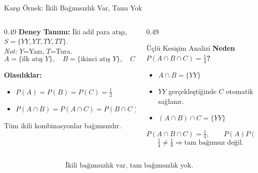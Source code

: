 \documentclass[light]{lutbeamer}
\begin{document}
\begin{frame}[fragile]{Karşı Örnek: İkili Bağımsızlık Var, Tamı Yok}
    \footnotesize
    \begin{columns}[T,onlytextwidth]
        \begin{column}{0.49\textwidth}
            \textbf{Deney Tanımı:} İki adil para atışı, \(S=\{YY,YT,TY,TT\}\).\\
            \textit{Not:} \(Y\)=Yazı, \(T\)=Tura.
            \[
            A=\{\text{ilk atış }Y\},\quad
            B=\{\text{ikinci atış }Y\},\quad
            C=\{\text{iki atış aynı}\}
            \]

            \textbf{Olasılıklar:}
            \begin{itemize}\itemsep2pt
                \item \(P(A)=P(B)=P(C)=\tfrac{1}{2}\)
                \item \(P(A\cap B)=P(A\cap C)=P(B\cap C)=\tfrac{1}{4}\)
            \end{itemize}
            Tüm ikili kombinasyonlar bağımsızdır.
        \end{column}
        \begin{column}{0.49\textwidth}
            \begin{alertblock}{Üçlü Kesişim Analizi}
                \textbf{Neden \(P(A \cap B \cap C)=\tfrac{1}{4}\)?}
                \begin{itemize}\itemsep2pt
                    \item \(A \cap B = \{YY\}\)
                    \item \(YY\) gerçekleştiğinde \(C\) otomatik sağlanır.
                    \item \((A \cap B) \cap C = \{YY\}\)
                \end{itemize}
                \[
                P(A \cap B \cap C)=\tfrac{1}{4},\qquad
                P(A)P(B)P(C)=\tfrac{1}{8}
                \]
                \[
                \tfrac{1}{4} \neq \tfrac{1}{8}\Rightarrow \text{tam bağımsız değil.}
                \]
            \end{alertblock}
        \end{column}
    \end{columns}

    \[
    \boxed{\text{İkili bağımsızlık var, tam bağımsızlık yok.}}
    \]
\end{frame}
\end{document}
